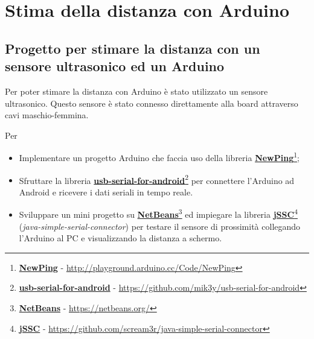 \chapter{Stima della distanza con Arduino}
\section{Progetto per stimare la distanza con un sensore ultrasonico ed un Arduino}
Per poter stimare la distanza con Arduino è stato utilizzato un sensore ultrasonico. Questo sensore è stato connesso direttamente alla board attraverso cavi maschio-femmina.

Per 

\begin{itemize}
	 \item Implementare un progetto Arduino che faccia uso della libreria \href{http://playground.arduino.cc/Code/NewPing}{\textbf{NewPing}}\footnote{\href{http://playground.arduino.cc/Code/NewPing}{\textbf{NewPing}} - \url{http://playground.arduino.cc/Code/NewPing}};
	 
	 \item Sfruttare la libreria \href{https://github.com/mik3y/usb-serial-for-android}{\textbf{usb-serial-for-android}}\footnote{\href{https://github.com/mik3y/usb-serial-for-android}{\textbf{usb-serial-for-android}} - \url{https://github.com/mik3y/usb-serial-for-android}} per connettere l'Arduino ad Android e ricevere i dati seriali in tempo reale.
	 
	 \item Sviluppare un mini progetto su \href{https://netbeans.org/}{\textbf{NetBeans}}\footnote{\href{https://netbeans.org/}{\textbf{NetBeans}} - \url{https://netbeans.org/}} ed impiegare la libreria \href{https://github.com/scream3r/java-simple-serial-connector}{\textbf{jSSC}}\footnote{\href{https://github.com/scream3r/java-simple-serial-connector}{\textbf{jSSC}} - \url{https://github.com/scream3r/java-simple-serial-connector}} (\textit{java-simple-serial-connector}) per testare il sensore di prossimità collegando l'Arduino al PC e visualizzando la distanza a schermo.
\end{itemize}

